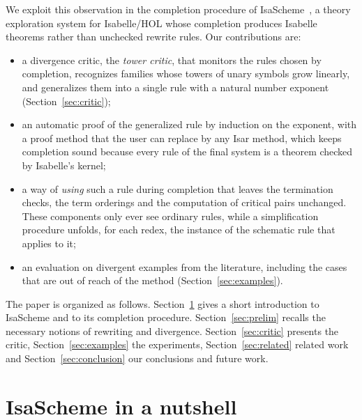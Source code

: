 \documentclass[preprint,12pt]{elsarticle}
\begin{document}
We exploit this observation in the completion procedure of
IsaScheme~\cite{MontanoRivas12}, a theory exploration system for
Isabelle/HOL whose completion produces Isabelle theorems rather than
unchecked rewrite rules. Our contributions are:
\begin{itemize}
  \item a divergence critic, the \emph{tower critic}, that monitors the rules chosen by
        completion, recognizes families whose towers of unary symbols grow
        linearly, and generalizes them into a single rule with a natural
        number exponent (Section~\ref{sec:critic});
  \item an automatic proof of the generalized rule by induction on the
        exponent, with a proof method that the user can replace by any Isar
        method, which keeps completion sound because every rule of the
        final system is a theorem checked by Isabelle's kernel;
  \item a way of \emph{using} such a rule during completion that leaves
        the termination checks, the term orderings and the computation of
        critical pairs unchanged. These components only ever see ordinary
        rules, while a simplification procedure unfolds, for each redex,
        the instance of the schematic rule that applies to it;
  \item an evaluation on divergent examples from the literature, including
        the cases that are out of reach of the method
        (Section~\ref{sec:examples}).
\end{itemize}

The paper is organized as follows. Section~\ref{sec:isascheme} gives a
short introduction to IsaScheme and to its completion procedure.
Section~\ref{sec:prelim} recalls the necessary notions of rewriting and
divergence. Section~\ref{sec:critic} presents the critic,
Section~\ref{sec:examples} the experiments, Section~\ref{sec:related}
related work and Section~\ref{sec:conclusion} our conclusions and future
work.

\section{IsaScheme in a nutshell}
\label{sec:isascheme}
\end{document}
